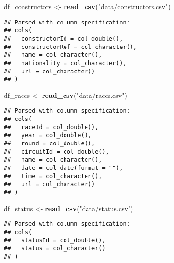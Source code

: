 \documentclass[
]{article}
\newenvironment{Shaded}{\begin{snugshade}}{\end{snugshade}}
\newcommand{\KeywordTok}[1]{\textcolor[rgb]{0.13,0.29,0.53}{\textbf{#1}}}
\newcommand{\NormalTok}[1]{#1}
\newcommand{\StringTok}[1]{\textcolor[rgb]{0.31,0.60,0.02}{#1}}
\begin{document}
\begin{Shaded}
\begin{Highlighting}[]
\NormalTok{df_constructors <-}\StringTok{ }\KeywordTok{read_csv}\NormalTok{(}\StringTok{"data/constructors.csv"}\NormalTok{)}
\end{Highlighting}
\end{Shaded}

\begin{verbatim}
## Parsed with column specification:
## cols(
##   constructorId = col_double(),
##   constructorRef = col_character(),
##   name = col_character(),
##   nationality = col_character(),
##   url = col_character()
## )
\end{verbatim}

\begin{Shaded}
\begin{Highlighting}[]
\NormalTok{df_races <-}\StringTok{ }\KeywordTok{read_csv}\NormalTok{(}\StringTok{"data/races.csv"}\NormalTok{)}
\end{Highlighting}
\end{Shaded}

\begin{verbatim}
## Parsed with column specification:
## cols(
##   raceId = col_double(),
##   year = col_double(),
##   round = col_double(),
##   circuitId = col_double(),
##   name = col_character(),
##   date = col_date(format = ""),
##   time = col_character(),
##   url = col_character()
## )
\end{verbatim}

\begin{Shaded}
\begin{Highlighting}[]
\NormalTok{df_status <-}\StringTok{ }\KeywordTok{read_csv}\NormalTok{(}\StringTok{"data/status.csv"}\NormalTok{)}
\end{Highlighting}
\end{Shaded}

\begin{verbatim}
## Parsed with column specification:
## cols(
##   statusId = col_double(),
##   status = col_character()
## )
\end{verbatim}
\end{document}
